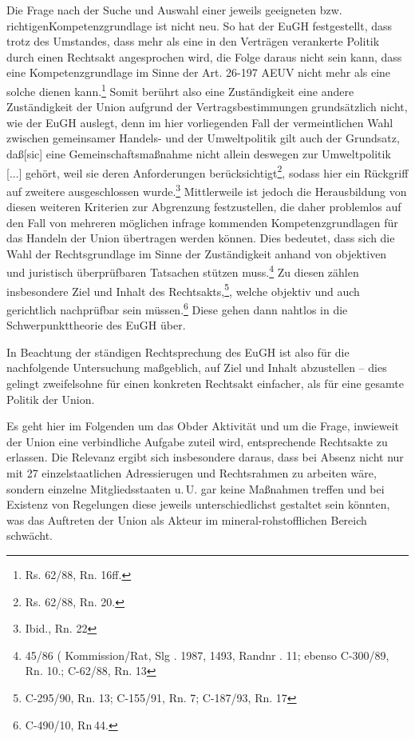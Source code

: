 \documentclass[12pt,a4paper,oneside]{book} %
\begin{document}
Die Frage nach der Suche und Auswahl einer jeweils geeigneten bzw. \glqq richtigen\grqq Kompetenzgrundlage ist nicht neu. So hat der EuGH festgestellt, dass trotz des Umstandes, dass mehr als eine in den Verträgen verankerte Politik durch einen Rechtsakt angesprochen wird, die Folge daraus nicht sein kann, dass eine Kompetenzgrundlage im Sinne der Art. 26-197 AEUV nicht mehr als eine solche dienen kann.\footnote{Rs. 62/88, Rn. 16ff.} Somit berührt also eine Zuständigkeit eine andere Zuständigkeit der Union aufgrund der Vertragsbestimmungen grundsätzlich nicht, wie der EuGH auslegt, denn im hier vorliegenden Fall der vermeintlichen Wahl zwischen gemeinsamer Handels- und der Umweltpolitik gilt auch der Grundsatz, \glqq daß[sic] eine Gemeinschaftsmaßnahme nicht allein deswegen zur Umweltpolitik [...] gehört, weil sie deren Anforderungen berücksichtigt\grqq\footnote{Rs. 62/88, Rn. 20.}, sodass hier ein Rückgriff auf zweitere ausgeschlossen wurde.\footnote{Ibid., Rn. 22} Mittlerweile ist jedoch die Herausbildung von diesen weiteren Kriterien zur Abgrenzung festzustellen, die daher problemlos auf den Fall von mehreren möglichen infrage kommenden Kompetenzgrundlagen für das Handeln der Union übertragen werden können.\autocite{Callies, Berliner Beiträge Nr. 117, S. 11.} Dies bedeutet, dass sich die Wahl der Rechtsgrundlage im Sinne der Zuständigkeit anhand von objektiven und juristisch überprüfbaren Tatsachen stützen muss.\footnote{45/86 ( Kommission/Rat, Slg . 1987, 1493, Randnr . 11; ebenso C-300/89, Rn. 10.; C-62/88, Rn. 13} Zu diesen zählen insbesondere Ziel und Inhalt des Rechtsakts,\footnote{C-295/90, Rn. 13; C-155/91, Rn. 7; C-187/93, Rn. 17}, welche objektiv und auch gerichtlich nachprüfbar sein müssen.\footnote{C-490/10, Rn 44.} Diese gehen dann nahtlos in die Schwerpunkttheorie des EuGH über.\autocite[Ausführlich zu Kompetenzarten und -grundlagen]{Groeben, von der/Schwarze/Walter Obwexer, 7. Aufl. 2015, AEUV Art. 2 Rn. 51}
	
In Beachtung der ständigen Rechtsprechung des EuGH ist also für die nachfolgende Untersuchung maßgeblich, auf Ziel und Inhalt abzustellen -- dies gelingt zweifelsohne für einen konkreten Rechtsakt einfacher, als für eine gesamte Politik der Union.
	
Es geht hier im Folgenden um das \glqq Ob\grqq der Aktivität und um die Frage, inwieweit der Union eine verbindliche Aufgabe zuteil wird, entsprechende Rechtsakte zu erlassen. Die Relevanz ergibt sich insbesondere daraus, dass bei Absenz nicht nur mit 27 einzelstaatlichen Adressierugen und Rechtsrahmen zu arbeiten wäre, sondern einzelne Mitgliedsstaaten u.\,U. gar keine Maßnahmen treffen und bei Existenz von Regelungen diese jeweils unterschiedlichst gestaltet sein könnten, was das Auftreten der Union als Akteur im mineral-rohstofflichen Bereich schwächt.
\end{document}
